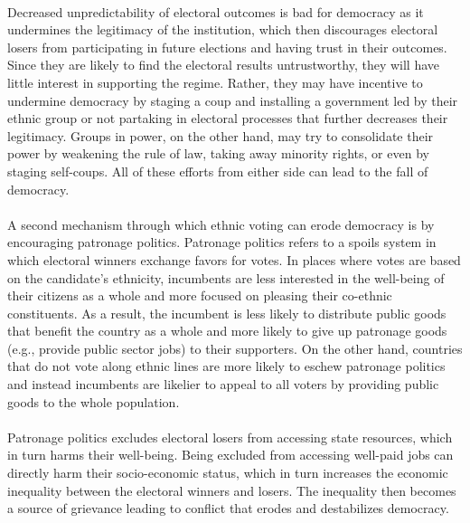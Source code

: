 \documentclass[a4paper, 12pt]{article}
\begin{document}
\paragraph{} 
Decreased unpredictability of electoral outcomes is bad for democracy as it undermines the legitimacy of the institution, which then discourages electoral losers from participating in future elections and having trust in their outcomes. Since they are likely to find the electoral results untrustworthy, they will have little interest in supporting the regime. Rather, they may have incentive to undermine democracy by staging a coup and installing a government led by their ethnic group or not partaking in electoral processes that further decreases their legitimacy. Groups in power, on the other hand, may try to consolidate their power by weakening the rule of law, taking away minority rights, or even by staging self-coups. All of these efforts from either side can lead to the fall of democracy.
\paragraph{} 
A second mechanism through which ethnic voting can erode democracy is by encouraging patronage politics. Patronage politics refers to a spoils system in which electoral winners exchange favors for votes. In places where votes are based on the candidate’s ethnicity, incumbents are less interested in the well-being of their citizens as a whole and more focused on pleasing their co-ethnic constituents. As a result, the incumbent is less likely to distribute public goods that benefit the country as a whole and more likely to give up patronage goods (e.g., provide public sector jobs) to their supporters. On the other hand, countries that do not vote along ethnic lines are more likely to eschew patronage politics and instead incumbents are likelier to appeal to all voters by providing public goods to the whole population.\cite{chandraWhyEthnicParties2004}
\paragraph{}
Patronage politics excludes electoral losers from accessing state resources, which in turn harms their well-being. Being excluded from accessing well-paid jobs can directly harm their socio-economic status, which in turn increases the economic inequality between the electoral winners and losers. The inequality then becomes a source of grievance leading to conflict that erodes and destabilizes democracy\cite{houleDoesEthnicVoting2018}.
\end{document}
